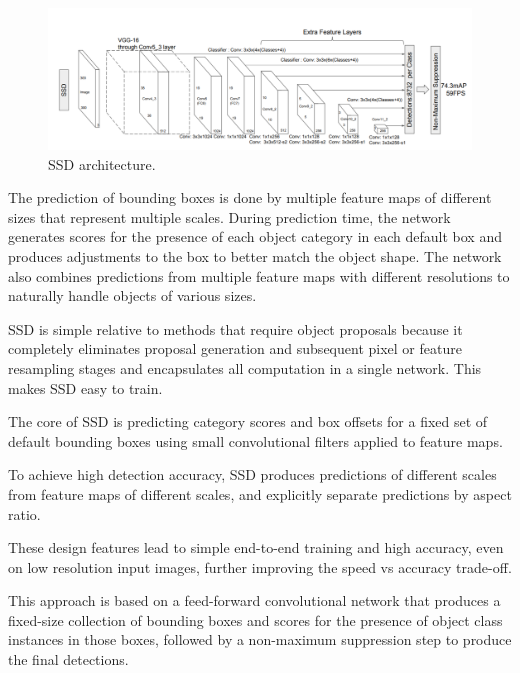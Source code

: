     \begin{figure}[htb]
        \centering
        \includegraphics[scale = 0.35]{Sections/2StateOfTheArt/2_images/ssd_arch.png}
        \caption{SSD architecture. \cite{Liu2016}} 
        \label{fig:ssd}
    \end{figure}



    \par The prediction of bounding boxes is done by multiple feature maps of different sizes that represent multiple scales. During prediction time, the network generates scores for the presence of each object category in each default box and produces adjustments to the box to better match the object shape. The network also combines predictions from multiple feature maps with different resolutions to naturally handle objects of various sizes.
    \par SSD is simple relative to methods that require object proposals because it completely eliminates proposal generation and subsequent pixel or feature resampling stages and encapsulates all computation in a single network. This makes SSD easy to train.
    \par The core of SSD is predicting category scores and box offsets for a fixed set of default bounding boxes using small convolutional filters applied to feature maps.
    \par To achieve high detection accuracy, SSD produces predictions of different scales from feature maps of different scales, and explicitly separate predictions by aspect ratio.
    \par These design features lead to simple end-to-end training and high accuracy, even on low resolution input images, further improving the speed vs accuracy trade-off.
    \par This approach is based on a feed-forward convolutional network that produces a fixed-size collection of bounding boxes and scores for the presence of object class instances in those boxes, followed by a non-maximum suppression step to produce the final detections. \cite{Liu2016}
   
